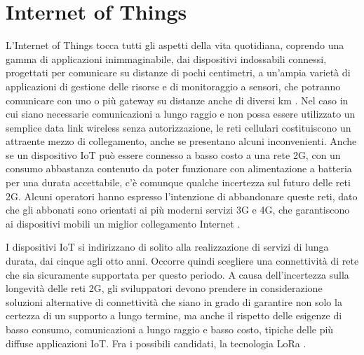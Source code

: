 \documentclass[a4paper]{report} %
\begin{document}
\section{Internet of Things}
L'Internet of Things tocca tutti gli aspetti della vita quotidiana, coprendo una gamma di applicazioni inimmaginabile, dai dispositivi indossabili connessi, progettati per comunicare su distanze di pochi centimetri, a un'ampia varietà di applicazioni di gestione delle risorse e di monitoraggio a sensori, che potranno comunicare con uno o più gateway su distanze anche di diversi km \cite{art:rif.20, art:rif.21}. 
Nel caso in cui siano necessarie comunicazioni a lungo raggio e non possa essere utilizzato un semplice data link wireless senza autorizzazione, le reti cellulari costituiscono un attraente mezzo di collegamento, anche se presentano alcuni inconvenienti. Anche se un dispositivo IoT può essere connesso a basso costo a una rete 2G, con un consumo abbastanza contenuto da poter funzionare con alimentazione a batteria per una durata accettabile, c'è comunque qualche incertezza sul futuro delle reti 2G. Alcuni operatori hanno espresso l'intenzione di abbandonare queste reti, dato che gli abbonati sono orientati ai più moderni servizi 3G e 4G, che garantiscono ai dispositivi mobili un miglior collegamento Internet \cite{art:rif.20, art:rif.21}.
 
I dispositivi IoT si indirizzano di solito alla realizzazione di servizi di lunga durata, dai cinque agli otto anni. Occorre quindi scegliere una connettività di rete che sia sicuramente supportata per questo periodo. A causa dell'incertezza sulla longevità delle reti 2G, gli sviluppatori devono prendere in considerazione soluzioni alternative di connettività che siano in grado di garantire non solo la certezza di un supporto a lungo termine, ma anche il rispetto delle esigenze di basso consumo, comunicazioni a lungo raggio e basso costo, tipiche delle più diffuse applicazioni IoT. Fra i possibili candidati, la tecnologia LoRa \cite{art:rif.20, art:rif.21}. 
\end{document}
